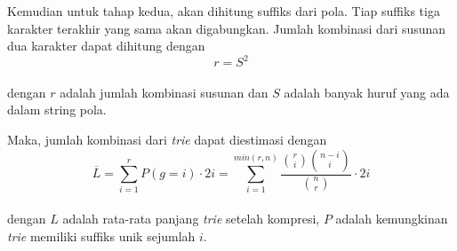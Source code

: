     Kemudian untuk tahap kedua, akan dihitung suffiks dari pola. Tiap suffiks tiga karakter terakhir yang sama akan digabungkan. Jumlah kombinasi dari susunan dua karakter dapat dihitung dengan \\
    \begin{equation}
      r = S^2
    \end{equation} \\
    dengan $r$ adalah jumlah kombinasi susunan dan $S$ adalah banyak huruf yang ada dalam string pola.

    Maka, jumlah kombinasi dari \emph{trie} dapat diestimasi dengan \\
    \begin{equation}
      \overline{L} = 
        \sum_{i=1}^{r} P\left(g = i \right) \cdot 2i =
          \sum_{i=1}^{min\left({r,n} \right)} \frac{\binom{r}{i} \binom{n - i}{i}}{\binom{n}{r}} \cdot 2i
    \end{equation} \\
    dengan $L$ adalah rata-rata panjang \emph{trie} setelah kompresi, $P$ adalah kemungkinan \emph{trie} memiliki suffiks unik sejumlah $i$.
